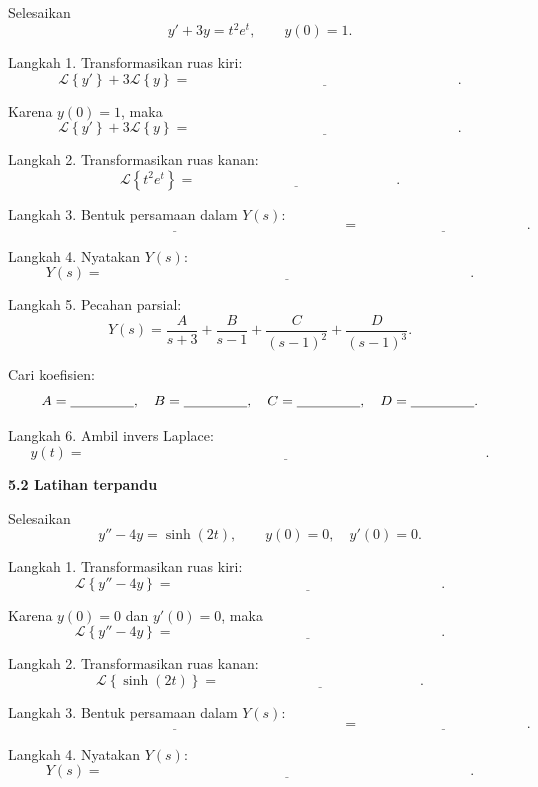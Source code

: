 \documentclass[11pt,a4paper]{article}
\newcommand{\Lcal}{\mathcal{L}}
\newcommand{\Lap}[1]{\Lcal\left\{#1\right\}}
\newcommand{\stepbox}[1]{\vspace{0.2cm}\colorbox{iteraLight}{\parbox{0.98\linewidth}{\textbf{#1}}}\vspace{0.15cm}}
\begin{document}
Selesaikan
\[
y'+3y=t^2e^t,
\qquad
y(0)=1.
\]

Langkah 1. Transformasikan ruas kiri:
\[
\Lap{y'}+3\Lap{y}
=
\underline{\hspace{8cm}}.
\]

Karena $y(0)=1$, maka
\[
\Lap{y'}+3\Lap{y}
=
\underline{\hspace{8cm}}.
\]

Langkah 2. Transformasikan ruas kanan:
\[
\Lap{t^2e^t}
=
\underline{\hspace{6cm}}.
\]

Langkah 3. Bentuk persamaan dalam $Y(s)$:
\[
\underline{\hspace{10cm}}
=
\underline{\hspace{5cm}}.
\]

Langkah 4. Nyatakan $Y(s)$:
\[
Y(s)=\underline{\hspace{11cm}}.
\]

Langkah 5. Pecahan parsial:
\[
Y(s)
=
\frac{A}{s+3}
+
\frac{B}{s-1}
+
\frac{C}{(s-1)^2}
+
\frac{D}{(s-1)^3}.
\]

Cari koefisien:
\[
A=\underline{\hspace{1.6cm}},
\quad
B=\underline{\hspace{1.6cm}},
\quad
C=\underline{\hspace{1.6cm}},
\quad
D=\underline{\hspace{1.6cm}}.
\]

Langkah 6. Ambil invers Laplace:
\[
y(t)=\underline{\hspace{12cm}}.
\]

\stepbox{5.2 Latihan terpandu}

Selesaikan
\[
y''-4y=\sinh(2t),
\qquad
y(0)=0,\quad y'(0)=0.
\]

Langkah 1. Transformasikan ruas kiri:
\[
\Lap{y''-4y}
=
\underline{\hspace{8cm}}.
\]

Karena $y(0)=0$ dan $y'(0)=0$, maka
\[
\Lap{y''-4y}
=
\underline{\hspace{8cm}}.
\]

Langkah 2. Transformasikan ruas kanan:
\[
\Lap{\sinh(2t)}
=
\underline{\hspace{6cm}}.
\]

Langkah 3. Bentuk persamaan dalam $Y(s)$:
\[
\underline{\hspace{10cm}}
=
\underline{\hspace{5cm}}.
\]

Langkah 4. Nyatakan $Y(s)$:
\[
Y(s)=\underline{\hspace{11cm}}.
\]
\end{document}
